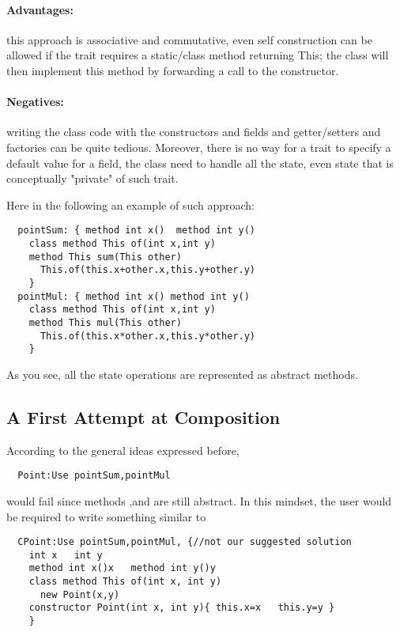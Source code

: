 \paragraph*{Advantages:} 
this approach is associative and commutative, even self construction
  can be allowed if the trait requires a static/class method
  returning This; the class will then implement this method by forwarding
  a call to the constructor.
  
\paragraph*{Negatives:} writing the class code with the constructors and
   fields and getter/setters and factories can be quite tedious.
   Moreover, there is no way for a trait to specify a default value for a field,
   the class need to handle all the state, even state that is conceptually
   "private" of such trait.

Here in the following an example of such approach:

\begin{lstlisting}
  pointSum: { method int x()  method int y()
    class method This of(int x,int y)
    method This sum(This other)
      This.of(this.x+other.x,this.y+other.y)
    }
  pointMul: { method int x() method int y()
    class method This of(int x,int y)
    method This mul(This other)
      This.of(this.x*other.x,this.y*other.y)
    }
\end{lstlisting}

As you see, all the state operations are represented as abstract methods.

\subsection{A First Attempt at Composition}
According to the general ideas expressed before,
\begin{lstlisting}
  Point:Use pointSum,pointMul
\end{lstlisting}  

\noindent would fail since methods \Q@x@,\Q@y@ and \Q@of@ are still abstract.
In this mindset, the user would be required to write something similar to

\begin{lstlisting}
  CPoint:Use pointSum,pointMul, {//not our suggested solution
    int x   int y
    method int x()x   method int y()y
    class method This of(int x, int y)
      new Point(x,y)
    constructor Point(int x, int y){ this.x=x   this.y=y }
    }
\end{lstlisting}


